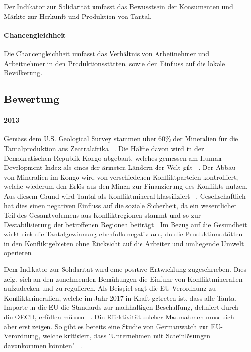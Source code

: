 Der Indikator zur Solidarität umfasst das Bewusstsein der Konsumenten und
Märkte zur Herkunft und Produktion von Tantal.

\paragraph{Chancengleichheit}

Die Chancengleichheit umfasst das Verhältnis von Arbeitnehmer und
Arbeitnehmer in den Produktionsstätten, sowie den Einfluss auf die lokale
Bevölkerung.

\subsection{Bewertung}

\paragraph{2013} Gemäss dem U.S. Geological Survey stammen über 60\% der Mineralien für die
Tantalproduktion aus Zentralafrika ~\cite{USGSMine8}. Die Hälfte davon
wird in der Demokratischen Republik Kongo abgebaut, welches gemessen am Human Development Index als eines der ärmsten
Ländern der Welt gilt ~\cite{UNDProgramme2018}. Der Abbau von Mineralien im
Kongo wird von verschiedenen Konfliktparteien kontrolliert, welche wiederum
den Erlös aus den Minen zur Finanzierung des Konflikts nutzen. Aus diesem Grund
wird Tantal als Konfliktmineral klassifiziert ~\cite{doevenspeck2012konfliktmineralien}.
Gesellschaftlich hat dies einen negativen Einfluss auf die soziale
Sicherheit, da ein wesentlicher Teil des Gesamtvolumens aus Konfliktregionen
stammt und so zur Destabilisierung der betroffenen Regionen beiträgt \cite{Thespoil65}. 
Im Bezug auf die Gesundheit wirkt sich die Tantalgewinnung ebenfalls negativ aus, da die 
Produktionsstätten in den Konfliktgebieten ohne Rücksicht auf die Arbeiter und umliegende Umwelt
operieren.

Dem Indikator zur Solidarität wird eine positive Entwicklung zugeschrieben.
Dies zeigt sich an den zunehmenden Bemühungen die Einfuhr von Konfliktmineralien 
aufzudecken und zu regulieren. Als Beispiel sagt die EU-Verordnung zu Konfliktmineralien, 
welche im Jahr 2017 in Kraft getreten ist, dass alle Tantal-Importe in die EU die Standards zur nachhaltigen Beschaffung, definiert durch die OECD, erfüllen müssen ~\cite{europeancommission}. Die Effektivität solcher 
Massnahmen muss sich aber erst zeigen. So gibt es bereits eine Studie von Germanwatch zur EU-Verordnung, 
welche kritisiert, dass "Unternehmen mit Scheinlösungen davonkommen könnten" ~\cite{Governan35}.

